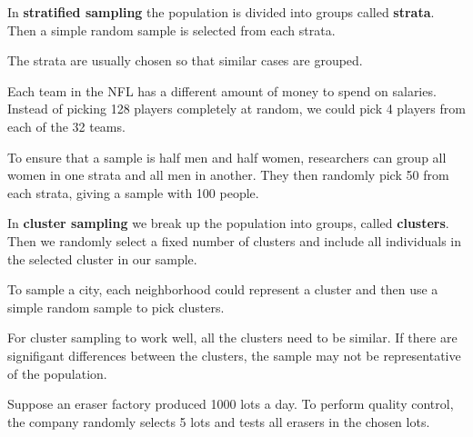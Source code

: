 \documentclass{beamer}
\begin{document}
\begin{frame}
\begin{definition}
In \textbf{stratified sampling} the population is divided into groups called \textbf{strata}. Then a simple random sample is selected from each strata.
\end{definition}\pause

\begin{note}
The strata are usually chosen so that similar cases are grouped.
\end{note}\pause

\begin{example}
Each team in the NFL has a different amount of money to spend on salaries. Instead of picking 128 players completely at random, we could pick 4 players from each of the 32 teams.
\end{example}\pause

\begin{example}
To ensure that a sample is half men and half women, researchers can group all women in one strata and all men in another. They then randomly pick 50 from each strata, giving a sample with 100 people.
\end{example}
\end{frame}

\begin{frame}
\begin{definition}
In \textbf{cluster sampling} we break up the population into groups, called \textbf{clusters}. Then we randomly select a fixed number of clusters and include all individuals in the selected cluster in our sample.
\end{definition}\pause

\begin{example}
To sample a city, each neighborhood could represent a cluster and then use a simple random sample to pick clusters.
\end{example}\pause

\begin{note}
For cluster sampling to work well, all the clusters need to be similar. If there are signifigant differences between the clusters, the sample may not be representative of the population.
\end{note}\pause

\begin{example}
Suppose an eraser factory produced 1000 lots a day. To perform quality control, the company randomly selects 5 lots and tests all erasers in the chosen lots.
\end{example}
\end{frame}
\end{document}
